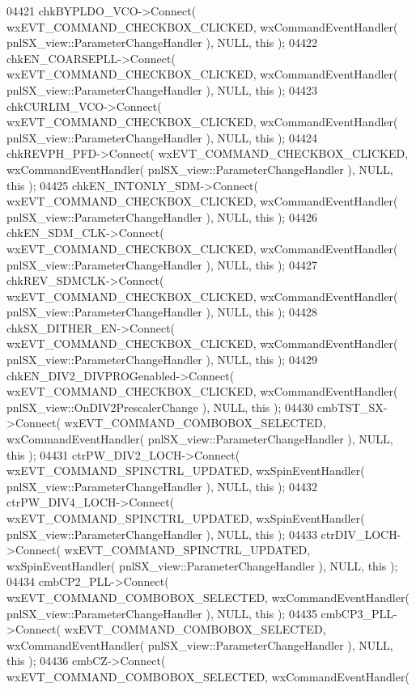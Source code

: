 \begin{DoxyCode}
04421     chkBYPLDO_VCO->Connect( wxEVT\_COMMAND\_CHECKBOX\_CLICKED, wxCommandEventHandler( 
      pnlSX_view::ParameterChangeHandler ), NULL, \textcolor{keyword}{this} );
04422     chkEN_COARSEPLL->Connect( wxEVT\_COMMAND\_CHECKBOX\_CLICKED, wxCommandEventHandler( 
      pnlSX_view::ParameterChangeHandler ), NULL, \textcolor{keyword}{this} );
04423     chkCURLIM_VCO->Connect( wxEVT\_COMMAND\_CHECKBOX\_CLICKED, wxCommandEventHandler( 
      pnlSX_view::ParameterChangeHandler ), NULL, \textcolor{keyword}{this} );
04424     chkREVPH_PFD->Connect( wxEVT\_COMMAND\_CHECKBOX\_CLICKED, wxCommandEventHandler( 
      pnlSX_view::ParameterChangeHandler ), NULL, \textcolor{keyword}{this} );
04425     chkEN_INTONLY_SDM->Connect( wxEVT\_COMMAND\_CHECKBOX\_CLICKED, wxCommandEventHandler( 
      pnlSX_view::ParameterChangeHandler ), NULL, \textcolor{keyword}{this} );
04426     chkEN_SDM_CLK->Connect( wxEVT\_COMMAND\_CHECKBOX\_CLICKED, wxCommandEventHandler( 
      pnlSX_view::ParameterChangeHandler ), NULL, \textcolor{keyword}{this} );
04427     chkREV_SDMCLK->Connect( wxEVT\_COMMAND\_CHECKBOX\_CLICKED, wxCommandEventHandler( 
      pnlSX_view::ParameterChangeHandler ), NULL, \textcolor{keyword}{this} );
04428     chkSX_DITHER_EN->Connect( wxEVT\_COMMAND\_CHECKBOX\_CLICKED, wxCommandEventHandler( 
      pnlSX_view::ParameterChangeHandler ), NULL, \textcolor{keyword}{this} );
04429     chkEN_DIV2_DIVPROGenabled->Connect( wxEVT\_COMMAND\_CHECKBOX\_CLICKED, wxCommandEventHandler( 
      pnlSX_view::OnDIV2PrescalerChange ), NULL, \textcolor{keyword}{this} );
04430     cmbTST_SX->Connect( wxEVT\_COMMAND\_COMBOBOX\_SELECTED, wxCommandEventHandler( 
      pnlSX_view::ParameterChangeHandler ), NULL, \textcolor{keyword}{this} );
04431     ctrPW_DIV2_LOCH->Connect( wxEVT\_COMMAND\_SPINCTRL\_UPDATED, wxSpinEventHandler( 
      pnlSX_view::ParameterChangeHandler ), NULL, \textcolor{keyword}{this} );
04432     ctrPW_DIV4_LOCH->Connect( wxEVT\_COMMAND\_SPINCTRL\_UPDATED, wxSpinEventHandler( 
      pnlSX_view::ParameterChangeHandler ), NULL, \textcolor{keyword}{this} );
04433     ctrDIV_LOCH->Connect( wxEVT\_COMMAND\_SPINCTRL\_UPDATED, wxSpinEventHandler( 
      pnlSX_view::ParameterChangeHandler ), NULL, \textcolor{keyword}{this} );
04434     cmbCP2_PLL->Connect( wxEVT\_COMMAND\_COMBOBOX\_SELECTED, wxCommandEventHandler( 
      pnlSX_view::ParameterChangeHandler ), NULL, \textcolor{keyword}{this} );
04435     cmbCP3_PLL->Connect( wxEVT\_COMMAND\_COMBOBOX\_SELECTED, wxCommandEventHandler( 
      pnlSX_view::ParameterChangeHandler ), NULL, \textcolor{keyword}{this} );
04436     cmbCZ->Connect( wxEVT\_COMMAND\_COMBOBOX\_SELECTED, wxCommandEventHandler( 

\end{DoxyCode}
